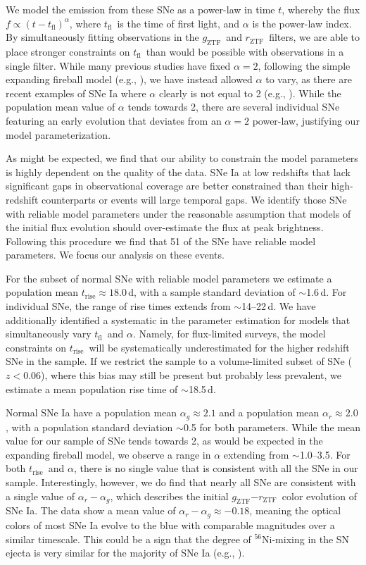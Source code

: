 \documentclass[twocolumn]{aastex63}
\newcommand{\rztf}{$r_\mathrm{ZTF}$}
\newcommand{\gztf}{$g_\mathrm{ZTF}$}
\newcommand{\tfl}{$t_\mathrm{fl}$}
\newcommand{\trise}{$t_\mathrm{rise}$}
\begin{document}
We model the emission from these SNe as a power-law in time $t$, whereby the
flux $f \propto (t - t_\mathrm{fl})^\alpha$, where \tfl\ is the time of first
light, and $\alpha$ is the power-law index. By simultaneously fitting
observations in the \gztf\ and \rztf\ filters, we are able to place stronger
constraints on \tfl\ than would be possible with observations in a single
filter. While many previous studies have fixed $\alpha = 2$, following the
simple expanding fireball model (e.g., \citealt{Riess99a}), we have instead
allowed $\alpha$ to vary, as there are recent examples of SNe Ia where
$\alpha$ clearly is not equal to 2 (e.g.,
\citealt{Zheng13,Zheng14,Goobar15,Miller18,Shappee19,Dimitriadis19}). While
the population mean value of $\alpha$ tends towards 2, there are several
individual SNe featuring an early evolution that deviates from an $\alpha = 2$
power-law, justifying our model parameterization.

As might be expected, we find that our ability to constrain the model
parameters is highly dependent on the quality of the data. SNe Ia at low
redshifts that lack significant gaps in observational coverage are better
constrained than their high-redshift counterparts or events will large
temporal gaps. We identify those SNe with reliable model parameters under the
reasonable assumption that models of the initial flux evolution should
over-estimate the flux at peak brightness. Following this procedure we find
that 51 of the SNe have reliable model parameters. We focus our analysis on
these events.

For the subset of normal SNe with reliable model parameters we estimate a
population mean \trise\;$\approx 18.0$\,d, with a sample standard deviation of
$\sim$1.6\,d. For individual SNe, the range of rise times extends from
$\sim$14--22\,d. We have additionally identified a systematic in the parameter
estimation for models that simultaneously vary \tfl\ and $\alpha$. Namely, for
flux-limited surveys, the model constraints on \trise\ will be systematically
underestimated for the higher redshift SNe in the sample. If we restrict the
sample to a volume-limited subset of SNe ($z < 0.06$), where this bias may
still be present but probably less prevalent, we estimate a mean population
rise time of $\sim$18.5\,d.

Normal SNe Ia have a population mean $\alpha_g \approx 2.1$ and a population
mean $\alpha_r \approx 2.0$, with a population standard deviation $\sim$0.5
for both parameters. While the mean value for our sample of SNe tends towards
2, as would be expected in the expanding fireball model, we observe a range in
$\alpha$ extending from $\sim$1.0--3.5. For both \trise\ and $\alpha$, there
is no single value that is consistent with all the SNe in our sample.
Interestingly, however, we do find that nearly all SNe are consistent with a
single value of $\alpha_r - \alpha_g$, which describes the initial \gztf$ -
$\rztf\ color evolution of SNe Ia. The data show a mean value of $\alpha_r -
\alpha_g \approx -0.18$, meaning the optical colors of most SNe Ia evolve to
the blue with comparable magnitudes over a similar timescale. This could be a
sign that the degree of $^{56}$Ni-mixing in the SN ejecta is very similar for
the majority of SNe Ia (e.g., \citealt{Piro16,Magee18,Magee19}).
\end{document}
